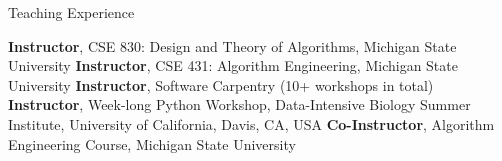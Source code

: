 \begin{rubric}{Teaching Experience}

\entry*[2021, 2022] \textbf{Instructor}, CSE 830: Design and Theory of Algorithms, Michigan State University
%
\entry*[2020] \textbf{Instructor}, CSE 431: Algorithm Engineering, Michigan State University
%
\entry*[2015 -- Present] \textbf{Instructor}, Software Carpentry (10+ workshops in total)
%
\entry*[Summer 2017] \textbf{Instructor}, Week-long Python Workshop, Data-Intensive Biology Summer Institute, University of California, Davis, CA, USA
%
\entry*[Spring 2016] \textbf{Co-Instructor}, Algorithm Engineering Course, Michigan State University 
%
\ifshort
\else

%
%
\fi
\end{rubric}